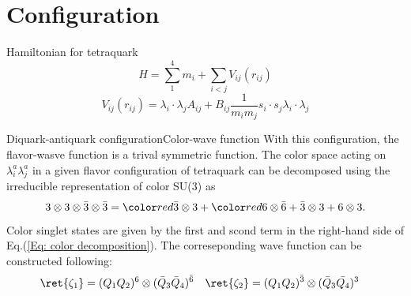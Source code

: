 \section{Configuration}
\begin{frame}{Hamiltonian for tetraquark}
    \begin{equation}
        H = \sum_{1}^{4}m_{i} + \sum_{i<j}V_{ij}(r_{ij})
    \end{equation}
    \[
        V_{ij}(r_{ij}) = \lambda_{i}\cdot\lambda_{j}A_{ij} + B_{ij}\frac{1}{m_{i}m_{j}}s_{i}\cdot s_{j}\lambda_{i}\cdot\lambda_{j}
    \]
\end{frame}
\begin{frame}{Diquark-antiquark configuration}{Color-wave function}
    With this configuration, the flavor-wasve function is a trival symmetric function. The color space acting on $\lambda_{i}^{a}\lambda_{j}^{a}$ in a given flavor configuration of tetraquark can be decomposed using the irreducible representation of color SU(3) as
    \begin{equation}\label{Eq: color decomposition}
        3\otimes3\otimes\bar{3}\otimes\bar{3} =\redtext{ \bar{3}\otimes3} + \redtext{6\otimes\bar{6}} + \bar{3}\otimes3 + 6\otimes3.
    \end{equation}
    Color singlet states are given by the first and scond term in the right-hand side of Eq.(\ref{Eq: color decomposition}). The correseponding wave function can be constructed following:
    \begin{align*}
        \ret{\zeta_{1}} & = (Q_{1}Q_{2})^{6}\otimes(\bar{Q}_{3}\bar{Q}_{4})^{\bar{6}} & \ret{\zeta_{2}} & = (Q_{1}Q_{2})^{\bar{3}}\otimes(\bar{Q}_{3}\bar{Q_{4}})^{3}
    \end{align*}
    
\end{frame}
